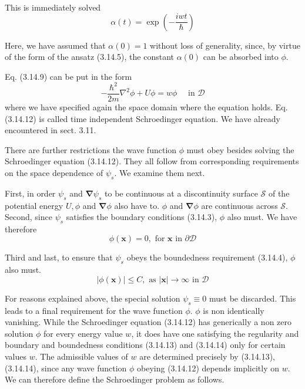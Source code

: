 \documentclass{article}
\begin{document}
This is immediately solved
$$
\begin{equation*}
\alpha(t)=\exp \left(-\frac{i w t}{\hbar}\right) \tag{3.14.11}
\end{equation*}
$$

Here, we have assumed that $\alpha(0)=1$ without loss of generality, since, by virtue of the form of the ansatz (3.14.5), the constant $\alpha(0)$ can be absorbed into $\phi$.

Eq. (3.14.9) can be put in the form
$$
\begin{equation*}
-\frac{\hbar^{2}}{2 m} \nabla^{2} \phi+U \phi=w \phi \quad \text { in } \mathcal{D} \tag{3.14.12}
\end{equation*}
$$
where we have specified again the space domain where the equation holds. Eq. (3.14.12) is called time independent Schroedinger equation. We have already encountered in sect. 3.11.

There are further restrictions the wave function $\phi$ must obey besides solving the Schroedinger equation (3.14.12). They all follow from corresponding requirements on the space dependence of $\psi_{s}$. We examine them next.

First, in order $\psi_{s}$ and $\boldsymbol{\nabla} \psi_{s}$ to be continuous at a discontinuity surface $\mathcal{S}$ of the potential energy $U, \phi$ and $\boldsymbol{\nabla} \phi$ also have to.
$\phi$ and $\boldsymbol{\nabla} \phi$ are continuous across $\mathcal{S}$.
Second, since $\psi_{s}$ satisfies the boundary conditions (3.14.3), $\phi$ also must. We have therefore
$$
\begin{equation*}
\phi(\boldsymbol{x})=0, \text { for } \boldsymbol{x} \text { in } \partial \mathcal{D} \tag{3.14.13}
\end{equation*}
$$

Third and last, to ensure that $\psi_{s}$ obeys the boundedness requirement (3.14.4), $\phi$ also must.
$$
\begin{equation*}
|\phi(\boldsymbol{x})| \leq C, \text { as }|\boldsymbol{x}| \rightarrow \infty \text { in } \mathcal{D} \tag{3.14.14}
\end{equation*}
$$

For reasons explained above, the special solution $\psi_{s} \equiv 0$ must be discarded. This leads to a final requirement for the wave function $\phi$.
$\phi$ is non identically vanishing.
While the Schroedinger equation (3.14.12) has generically a non zero solution $\phi$ for every energy value $w$, it does have one satisfying the regularity and boundary and boundedness conditions (3.14.13) and (3.14.14) only for certain values $w$. The admissible values of $w$ are determined precisely by (3.14.13), (3.14.14), since any wave function $\phi$ obeying (3.14.12) depends implicitly on $w$. We can therefore define the Schroedinger problem as follows.
\end{document}
